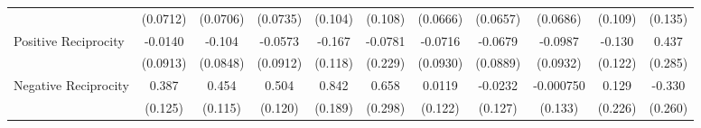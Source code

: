 {\begin{tabular}{l*{10}{c}}
            &    (0.0712)         &    (0.0706)         &    (0.0735)         &     (0.104)         &     (0.108)         &    (0.0666)         &    (0.0657)         &    (0.0686)         &     (0.109)         &     (0.135)         \\
\addlinespace
Positive Reciprocity&     -0.0140         &      -0.104         &     -0.0573         &      -0.167         &     -0.0781         &     -0.0716         &     -0.0679         &     -0.0987         &      -0.130         &       0.437         \\
            &    (0.0913)         &    (0.0848)         &    (0.0912)         &     (0.118)         &     (0.229)         &    (0.0930)         &    (0.0889)         &    (0.0932)         &     (0.122)         &     (0.285)         \\
\addlinespace
Negative Reciprocity&       0.387\sym{**} &       0.454\sym{***}&       0.504\sym{***}&       0.842\sym{***}&       0.658\sym{*}  &      0.0119         &     -0.0232         &   -0.000750         &       0.129         &      -0.330         \\
            &     (0.125)         &     (0.115)         &     (0.120)         &     (0.189)         &     (0.298)         &     (0.122)         &     (0.127)         &     (0.133)         &     (0.226)         &     (0.260)         \\
\bottomrule
\end{tabular}
}
